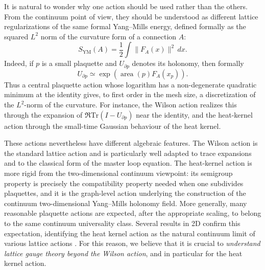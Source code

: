 \documentclass[11pt,a4paper,reqno]{article}
\theoremstyle{definition}
\theoremstyle{remark}
\newcommand\Tr{\mathrm{Tr}}
\newcommand\YM{\mathrm{YM}}
\begin{document}
It is natural to wonder why one action should be used rather than the others. From the continuum point of view, they should be understood as different lattice regularizations of the same formal Yang--Mills energy, defined formally as the squared $L^2$ norm of the curvature form of a connection $A$:
\[
S_{\YM}(A)=\frac{1}{2}\int \|F_A(x)\|^2\,dx .
\]
Indeed, if \(p\) is a small plaquette and \(U_{\partial p}\) denotes its holonomy, then formally
\[
U_{\partial p}\simeq \exp(\operatorname{area}(p)F_A(x_p)).
\]
Thus a central plaquette action whose logarithm has a non-degenerate quadratic minimum at the identity gives, to first order in the mesh size, a discretization of the \(L^2\)-norm of the curvature. For instance, the Wilson action realizes this through the expansion of \(\Re\Tr(I-U_{\partial p})\) near the identity, and the heat-kernel action through the small-time Gaussian behaviour of the heat kernel.

These actions nevertheless have different algebraic features. The Wilson action is the standard lattice action and is particularly well adapted to trace expansions and to the classical form of the master loop equation. The heat-kernel action is more rigid from the two-dimensional continuum viewpoint: its semigroup property is precisely the compatibility property needed when one subdivides plaquettes, and it is the graph-level action underlying the construction of the continuum two-dimensional Yang--Mills holonomy field. More generally, many reasonable plaquette actions are expected, after the appropriate scaling, to belong to the same continuum universality class. Several results in 2D confirm this expectation, identifying the heat kernel action as the natural continuum limit of various lattice actions \cite{ChevGar25,ChevShen26,DangNohra26}. For this reason, we believe that it is crucial to \emph{understand lattice gauge theory beyond the Wilson action}, and in particular for the heat kernel action.
\end{document}
